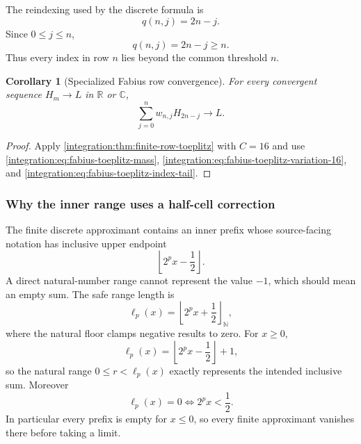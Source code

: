 \documentclass[11pt,oneside]{article}
\newtheorem{corollary}[theorem]{Corollary}
\theoremstyle{definition}
\theoremstyle{remark}
\newcommand{\R}{\mathbb R}
\newcommand{\C}{\mathbb C}
\newcommand{\N}{\mathbb N}
\begin{document}
The reindexing used by the discrete formula is
\begin{equation}
 q(n,j)=2n-j.
 \label{integration:eq:fabius-toeplitz-index}
\end{equation}
Since $0\le j\le n$,
\begin{equation}
 q(n,j)=2n-j\ge n.
 \label{integration:eq:fabius-toeplitz-index-tail}
\end{equation}
Thus every index in row $n$ lies beyond the common threshold $n$.

\begin{corollary}[Specialized Fabius row convergence]
\label{integration:cor:fabius-toeplitz-convergence}
For every convergent sequence $H_m\to L$ in $\R$ or $\C$,
\begin{equation}
 \sum_{j=0}^{n}w_{n,j}H_{2n-j}\longrightarrow L.
 \label{integration:eq:fabius-toeplitz-convergence}
\end{equation}
\end{corollary}

\begin{proof}
Apply \cref{integration:thm:finite-row-toeplitz} with $C=16$ and use
\eqref{integration:eq:fabius-toeplitz-mass}, \eqref{integration:eq:fabius-toeplitz-variation-16}, and
\eqref{integration:eq:fabius-toeplitz-index-tail}.
\end{proof}

\subsubsection{Why the inner range uses a half-cell correction}

The finite discrete approximant contains an inner prefix whose source-facing notation has
inclusive upper endpoint
\begin{equation}
 \left\lfloor2^px-\frac12\right\rfloor.
 \label{integration:eq:inclusive-upper-bound}
\end{equation}
A direct natural-number range cannot represent the value $-1$, which should mean an empty
sum.  The safe range length is
\begin{equation}
 \ell_p(x)=\left\lfloor2^px+\frac12\right\rfloor_{\N},
 \label{integration:eq:corrected-range-length}
\end{equation}
where the natural floor clamps negative results to zero.  For $x\ge0$,
\begin{equation}
 \ell_p(x)=\left\lfloor2^px-\frac12\right\rfloor+1,
 \label{integration:eq:range-length-inclusive}
\end{equation}
so the natural range $0\le r<\ell_p(x)$ exactly represents the intended inclusive sum.
Moreover
\begin{equation}
 \ell_p(x)=0
 \iff 2^px<\frac12.
 \label{integration:eq:range-length-zero-iff}
\end{equation}
In particular every prefix is empty for $x\le0$, so every finite approximant vanishes there
before taking a limit.
\end{document}
